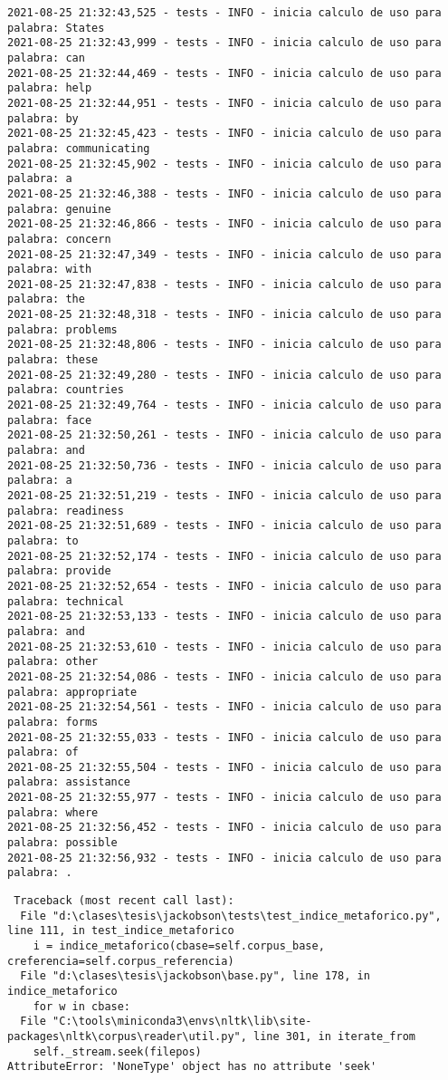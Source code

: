 \documentclass[11pt]{article}
\begin{document}
\begin{verbatim}
2021-08-25 21:32:43,525 - tests - INFO - inicia calculo de uso para palabra: States
2021-08-25 21:32:43,999 - tests - INFO - inicia calculo de uso para palabra: can
2021-08-25 21:32:44,469 - tests - INFO - inicia calculo de uso para palabra: help
2021-08-25 21:32:44,951 - tests - INFO - inicia calculo de uso para palabra: by
2021-08-25 21:32:45,423 - tests - INFO - inicia calculo de uso para palabra: communicating
2021-08-25 21:32:45,902 - tests - INFO - inicia calculo de uso para palabra: a
2021-08-25 21:32:46,388 - tests - INFO - inicia calculo de uso para palabra: genuine
2021-08-25 21:32:46,866 - tests - INFO - inicia calculo de uso para palabra: concern
2021-08-25 21:32:47,349 - tests - INFO - inicia calculo de uso para palabra: with
2021-08-25 21:32:47,838 - tests - INFO - inicia calculo de uso para palabra: the
2021-08-25 21:32:48,318 - tests - INFO - inicia calculo de uso para palabra: problems
2021-08-25 21:32:48,806 - tests - INFO - inicia calculo de uso para palabra: these
2021-08-25 21:32:49,280 - tests - INFO - inicia calculo de uso para palabra: countries
2021-08-25 21:32:49,764 - tests - INFO - inicia calculo de uso para palabra: face
2021-08-25 21:32:50,261 - tests - INFO - inicia calculo de uso para palabra: and
2021-08-25 21:32:50,736 - tests - INFO - inicia calculo de uso para palabra: a
2021-08-25 21:32:51,219 - tests - INFO - inicia calculo de uso para palabra: readiness
2021-08-25 21:32:51,689 - tests - INFO - inicia calculo de uso para palabra: to
2021-08-25 21:32:52,174 - tests - INFO - inicia calculo de uso para palabra: provide
2021-08-25 21:32:52,654 - tests - INFO - inicia calculo de uso para palabra: technical
2021-08-25 21:32:53,133 - tests - INFO - inicia calculo de uso para palabra: and
2021-08-25 21:32:53,610 - tests - INFO - inicia calculo de uso para palabra: other
2021-08-25 21:32:54,086 - tests - INFO - inicia calculo de uso para palabra: appropriate
2021-08-25 21:32:54,561 - tests - INFO - inicia calculo de uso para palabra: forms
2021-08-25 21:32:55,033 - tests - INFO - inicia calculo de uso para palabra: of
2021-08-25 21:32:55,504 - tests - INFO - inicia calculo de uso para palabra: assistance
2021-08-25 21:32:55,977 - tests - INFO - inicia calculo de uso para palabra: where
2021-08-25 21:32:56,452 - tests - INFO - inicia calculo de uso para palabra: possible
2021-08-25 21:32:56,932 - tests - INFO - inicia calculo de uso para palabra: .
\end{verbatim}

\begin{verbatim}
 Traceback (most recent call last):
  File "d:\clases\tesis\jackobson\tests\test_indice_metaforico.py", line 111, in test_indice_metaforico
    i = indice_metaforico(cbase=self.corpus_base, creferencia=self.corpus_referencia)
  File "d:\clases\tesis\jackobson\base.py", line 178, in indice_metaforico
    for w in cbase:
  File "C:\tools\miniconda3\envs\nltk\lib\site-packages\nltk\corpus\reader\util.py", line 301, in iterate_from
    self._stream.seek(filepos)
AttributeError: 'NoneType' object has no attribute 'seek'
\end{verbatim}
\end{document}
